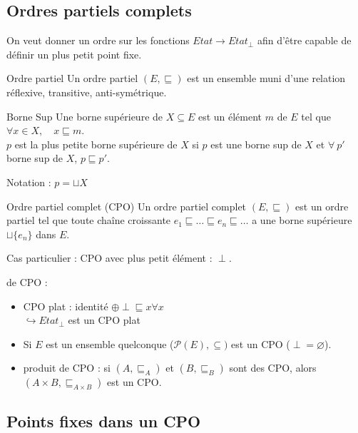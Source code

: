 \documentclass[10pt,a4paper]{article}
\begin{document}
\subsection{Ordres partiels complets}
On veut donner un ordre sur les fonctions $Etat \rightarrow Etat_{\perp}$ afin d'être capable de définir un plus petit point fixe.
\begin{definition}{Ordre partiel}
 Un ordre partiel $(E,\sqsubseteq)$ est un ensemble muni d'une relation réflexive, transitive, anti-symétrique.\\
\end{definition}
\begin{definition}{Borne Sup}
 Une borne supérieure de $X \subseteq E$ est un élément $m$ de $E$ tel que \\
\indent $\forall x \in X, \quad x \sqsubseteq m$.\\
$p$ est la plus petite borne supérieure de $X$ si $p$ est une borne sup de $X$ et $\forall \: p'$ borne sup de $X$, $p \sqsubseteq p'$.

Notation : $p = \sqcup X$\\
\end{definition}
\begin{definition}{Ordre partiel complet (CPO)}
 Un ordre partiel complet $(E,\sqsubseteq)$ est un ordre partiel tel que toute chaîne croissante $e_1 \sqsubseteq \dots \sqsubseteq e_n \sqsubseteq \dots $ a une borne supérieure $\sqcup \{ e_n \}$ dans $E$.

 Cas particulier : CPO avec plus petit élément : $\perp$.\\
\end{definition}
\begin{exs}{de CPO :}
 \begin{itemize}
  \item CPO plat : identité $\oplus \perp \sqsubseteq x \forall x$ 
  \\ $\hookrightarrow Etat_{\perp}$ est un CPO plat
  \item Si $E$ est un ensemble quelconque ($\mathcal{P}(E), \subseteq)$ est un CPO ($\perp = \varnothing $).
  \item produit de CPO : si $(A, \sqsubseteq_A)$ et $(B, \sqsubseteq_B)$ sont des CPO, alors $(A\times B, \sqsubseteq_{A\times B})$ est un CPO.
 \end{itemize}

\end{exs}



\subsection{Points fixes dans un CPO}
\end{document}
